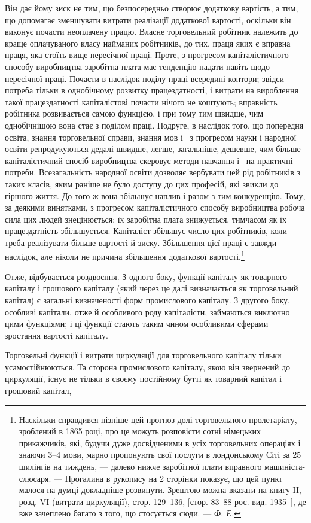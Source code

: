 \parcont{}  %
Він дає йому зиск не тим, що безпосередньо створює додаткову
вартість, а тим, що допомагає зменшувати витрати реалізації додаткової
вартості, оскільки він виконує почасти неоплачену працю.
Власне торговельний робітник належить до краще оплачуваного
класу найманих робітників, до тих, праця яких є вправна праця,
яка стоїть вище пересічної праці. Проте, з прогресом капіталістичного
способу виробництва заробітна плата має тенденцію
падати навіть щодо пересічної праці. Почасти в наслідок поділу
праці всередині контори; звідси потреба тільки в однобічному
розвитку працездатності, і витрати на вироблення такої працездатності
капіталістові почасти нічого не коштують; вправність
робітника розвивається самою функцією, і при тому тим швидше,
чим однобічнішою вона стає з поділом праці. Подруге, в наслідок
того, що попередня освіта, знання торговельної справи,
знання мов і~ з прогресом науки і народної освіти репродукуються
дедалі швидше, легше, загальніше, дешевше, чим
більше капіталістичний спосіб виробництва скеровує методи
навчання і~ на практичні потреби. Всезагальність народної
освіти дозволяє вербувати цей рід робітників з таких класів,
яким раніше не було доступу до цих професій, які звикли до
гіршого життя. До того ж вона збільшує наплив і разом з тим
конкуренцію. Тому, за деякими винятками, з прогресом капіталістичного
способу виробництва робоча сила цих людей знецінюється;
їх заробітна плата знижується, тимчасом як їх
працездатність збільшується. Капіталіст збільшує число цих
робітників, коли треба реалізувати більше вартості й зиску.
Збільшення цієї праці є завжди наслідок, але ніколи не причина
збільшення додаткової вартості.\footnote{
Наскільки справдився пізніше цей прогноз долі торговельного пролетаріату,
зроблений в 1865 році, про це можуть розповісти сотні німецьких
прикажчиків, які, будучи дуже досвідченими в усіх торговельних операціях
і знаючи 3--4 мови, марно пропонують свої послуги в лондонському Сіті за
25 шилінгів на тиждень, — далеко нижче заробітної плати вправного машиніста-слюсаря. — Прогалина в
рукопису на 2 сторінки показує, що цей пункт
малося на думці докладніше розвинути. Зрештою можна вказати на книгу II,
розд. VI (витрати циркуляції), стор. 129--136, [стор. 83--88 рос. вид. 1935~],
де вже зачеплено багато з того, що стосується сюди. — \emph{Ф. Е.}
}

Отже, відбувається роздвоєння. З одного боку, функції капіталу
як товарного капіталу і грошового капіталу (який через
це далі визначається як торговельний капітал) є загальні визначеності
форм промислового капіталу. З другого боку, особливі
капітали, отже й особливого роду капіталісти, займаються виключно
цими функціями; і ці функції стають таким чином особливими
сферами зростання вартості капіталу.

Торговельні функції і витрати циркуляції для торговельного
капіталу тільки усамостійнюються. Та сторона промислового капіталу,
якою він звернений до циркуляції, існує не тільки в своєму
постійному бутті як товарний капітал і грошовий капітал,
\parbreak{}  %
